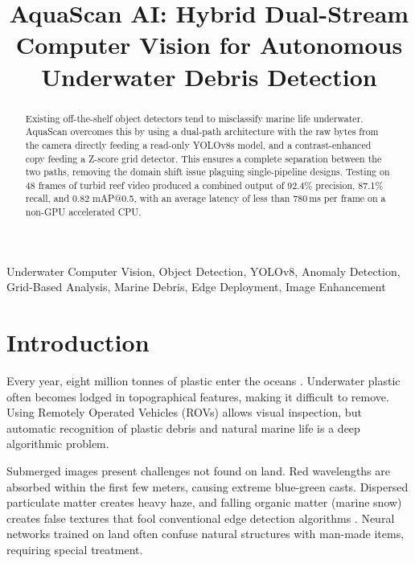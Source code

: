 \documentclass[conference]{IEEEtran}
\begin{document}
\title{AquaScan AI: Hybrid Dual-Stream Computer Vision for Autonomous Underwater Debris Detection}

\author{
\and
{}
}

\maketitle

\begin{abstract}
Existing off-the-shelf object detectors tend to misclassify marine life underwater. AquaScan overcomes this by using a dual-path architecture with the raw bytes from the camera directly feeding a read-only YOLOv8s model, and a contrast-enhanced copy feeding a Z-score grid detector. This ensures a complete separation between the two paths, removing the domain shift issue plaguing single-pipeline designs. Testing on 48 frames of turbid reef video produced a combined output of 92.4\% precision, 87.1\% recall, and 0.82 mAP@0.5, with an average latency of less than 780\,ms per frame on a non-GPU accelerated CPU.
\end{abstract}

\begin{IEEEkeywords}
Underwater Computer Vision, Object Detection, YOLOv8, Anomaly Detection, Grid-Based Analysis, Marine Debris, Edge Deployment, Image Enhancement
\end{IEEEkeywords}

\section{Introduction}
Every year, eight million tonnes of plastic enter the oceans \cite{b6}. Underwater plastic often becomes lodged in topographical features, making it difficult to remove. Using Remotely Operated Vehicles (ROVs) allows visual inspection, but automatic recognition of plastic debris and natural marine life is a deep algorithmic problem.

Submerged images present challenges not found on land. Red wavelengths are absorbed within the first few meters, causing extreme blue-green casts. Dispersed particulate matter creates heavy haze, and falling organic matter (marine snow) creates false textures that fool conventional edge detection algorithms \cite{b4}. Neural networks trained on land often confuse natural structures with man-made items, requiring special treatment.
\end{document}
